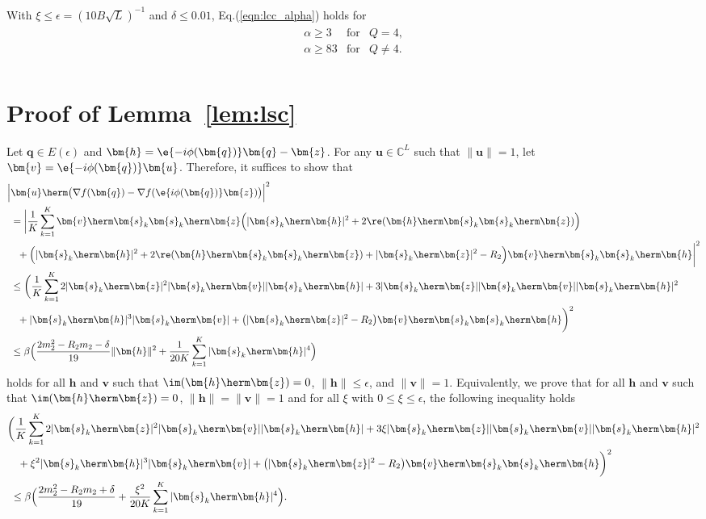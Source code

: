 With $\xi\leq\epsilon=(10B\sqrt{L})^{-1}$ and $\delta\leq0.01$, Eq.(\ref{eqn:lcc_alpha}) holds for 
\begin{align}
	\begin{array}{lcc}
		\alpha\geq 3&\text{for}&Q=4,\\
		\alpha\geq 83&\text{for}&Q\neq4.\\
	\end{array}	\nonumber
\end{align} 



\section{Proof of Lemma~\ref{lem:lsc}}\label{appdx:lsc}
Let $\bm{q}\in E(\epsilon)$ and $\bm{h}=\e{-i\phi(\bm{q})}\bm{q}-\bm{z}$. For any $\bm{u}\in\mathbb{C}^L$ such that $\|\bm{u}\|=1$, let $\bm{v}=\e{-i\phi(\bm{q})}\bm{u}$. 
Therefore, it suffices to show that 
\begin{align}
	&\Big|\bm{u}\herm\big(\nabla f(\bm{q})-\nabla f(\e{i\phi(\bm{q})}\bm{z})\big)\Big|^2\nonumber\\
	&\,\,=\bigg|\frac{1}{K}\sum_{k=1}^K\bm{v}\herm\bm{s}_k\bm{s}_k\herm\bm{z}\Big(|\bm{s}_k\herm\bm{h}|^2+2\re(\bm{h}\herm\bm{s}_k\bm{s}_k\herm\bm{z})\Big)\nonumber\\
	&\quad+\Big(|\bm{s}_k\herm\bm{h}|^2+2\re(\bm{h}\herm\bm{s}_k\bm{s}_k\herm\bm{z})+|\bm{s}_k\herm\bm{z}|^2-R_2\Big)\bm{v}\herm\bm{s}_k\bm{s}_k\herm\bm{h}\bigg|^2\nonumber\\
	&\,\,\leq\bigg(\frac{1}{K}\sum_{k=1}^K2|\bm{s}_k\herm\bm{z}|^2|\bm{s}_k\herm\bm{v}||\bm{s}_k\herm\bm{h}| +3|\bm{s}_k\herm\bm{z}||\bm{s}_k\herm\bm{v}||\bm{s}_k\herm\bm{h}|^2\nonumber\\
	&\quad+|\bm{s}_k\herm\bm{h}|^3|\bm{s}_k\herm\bm{v}|
	+\big(|\bm{s}_k\herm\bm{z}|^2-R_2\big)\bm{v}\herm\bm{s}_k\bm{s}_k\herm\bm{h}\bigg)^2\nonumber\\
	&\,\,\leq\beta\Big(\frac{2  m_2^2-R_2m_2-\delta}{19}\|\bm{h}\|^2+\frac{1}{20K}\sum_{k=1}^K|\bm{s}_k\herm\bm{h}|^4\Big)\nonumber
\end{align}
holds for all $\bm{h}$ and $\bm{v}$ such that $\im(\bm{h}\herm\bm{z})=0$, $\|\bm{h}\|\leq\epsilon$, and $\|\bm{v}\|=1$. Equivalently, we prove that for all $\bm{h}$ and $\bm{v}$ such that $\im(\bm{h}\herm\bm{z})=0$, $\|\bm{h}\|=\|\bm{v}\|=1$ and
for all $\xi$ with $0\leq \xi\leq \epsilon$, the following inequality holds
\begin{align}
	&\bigg(\frac{1}{K}\sum_{k=1}^K2|\bm{s}_k\herm\bm{z}|^2|\bm{s}_k\herm\bm{v}||\bm{s}_k\herm\bm{h}| +3\xi|\bm{s}_k\herm\bm{z}||\bm{s}_k\herm\bm{v}||\bm{s}_k\herm\bm{h}|^2\nonumber\\
	&\quad+\xi^2|\bm{s}_k\herm\bm{h}|^3|\bm{s}_k\herm\bm{v}|
	+\big(|\bm{s}_k\herm\bm{z}|^2-R_2\big)\bm{v}\herm\bm{s}_k\bm{s}_k\herm\bm{h}\bigg)^2\nonumber\\
	&\,\,\leq\beta\Big(\frac{2  m_2^2-R_2m_2+\delta}{19}+\frac{\xi^2}{20K}\sum_{k=1}^K|\bm{s}_k\herm\bm{h}|^4\Big).\nonumber
\end{align}

